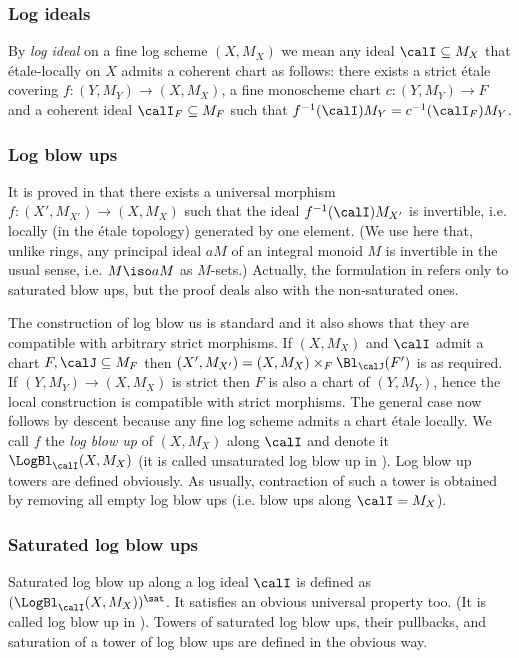 \documentclass[10pt]{../fichiers-configuration-latex/smfart}
\begin{document}
\subsubsection{Log ideals}\label{8-logidealsec} By {\em log
ideal} on a fine log scheme $(X,M_X)$ we mean any ideal
$\calI\subseteq M_X$ that \'etale-locally on $X$ admits
a coherent chart as follows: there exists a strict \'etale
covering $f{\colon}(Y,M_Y)\to(X,M_X)$, a fine monoscheme chart
$c{\colon}(Y,M_Y)\to F$ and a coherent ideal $\calI_F\subseteq M_F$
such that $f^{-1}(\calI)M_Y=c^{-1}(\calI_F)M_Y$.

\subsubsection{Log blow ups}\label{8-logblowsec} It is proved
in \cite[4.2]{Toric@Niziol} that there exists a universal
morphism $f{\colon}(X',M_{X'})\to(X,M_X)$ such that the ideal
$f^{-1}(\calI)M_{X'}$ is invertible, i.e. locally (in the \'etale
topology) generated by one element. (We use here that, unlike rings,
any principal ideal $aM$ of an integral monoid $M$ is invertible
in the usual sense, i.e. $M\iso aM$ as $M$-sets.) Actually,
the formulation in \cite{Toric@Niziol} refers only to saturated
blow ups, but the proof deals also with the non-saturated ones.

The construction of log blow us is standard and it also shows
that they are compatible with arbitrary strict morphisms. If
$(X,M_X)$ and $\calI$ admit a chart $F,\calJ\subseteq M_F$ then
$(X',M_{X'})=(X,M_X)\times_F\Bl_\calJ(F')$ is as required. If
$(Y,M_Y)\to(X,M_X)$ is strict then $F$ is also a chart of $(Y,M_Y)$,
hence the local construction is compatible with strict morphisms. The
general case now follows by descent because any fine log scheme
admits a chart  \'etale locally. We call $f$ the {\em log blow up}
of $(X,M_X)$ along $\calI$ and denote it $\LogBl_{\calI}(X,M_X)$
(it is called unsaturated log blow up in \cite{Toric@Niziol}). Log
blow up towers are defined obviously. As usually, contraction
of such a tower is obtained by removing all empty log blow ups
(i.e. blow ups along $\calI=M_X$).

\subsubsection{Saturated log blow ups}\label{8-satlogblowsec}
Saturated log blow up along a log ideal $\calI$ is defined
as $(\LogBl_{\calI}(X,M_X))^\sat$. It satisfies an obvious
universal property too. (It is called log blow up in
\cite{Toric@Niziol}). Towers of saturated log blow ups, their
pullbacks, and saturation of a tower of log blow ups are defined
in the obvious way.
\end{document}
